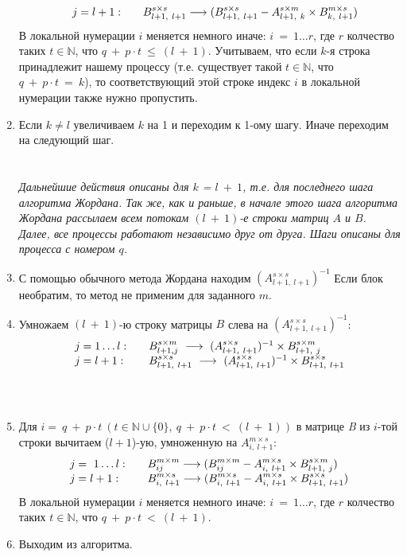 \documentclass[14pt,a4paper, openany]{article}
\begin{document}
\begin{enumerate}
$$\begin{array}{l l l}
	 & j = l+1:  & \quad B _{l+1,\ l+1}^{s \times s} \longrightarrow (B _{l+1,\ l+1}^{s \times s} - A _{l+1,\ k}^{s \times m} \times  B _{k,\ l+1}^{m \times s}) 
	\end{array}
	$$
	В локальной нумерации $i$ меняется немного иначе: $i\ =\ 1 \ldots r$, где $r$ колчество таких $t\in \mathbb{N}$, что 
	$q\ +\ p\cdot t\ \leq\ (l\ +\ 1)$. Учитываем, что если $k$-я строка принадлежит нашему процессу (т.е. существует такой 
	$t\in \mathbb{N}$, что $q\ +\ p\cdot t\ =\ k$), то соответствующий этой строке индекс $i$ в локальной нумерации 
	также нужно пропустить.

	\item Если $ k \neq l $ увеличиваем $k$ на 1 и переходим к 1-ому шагу. Иначе переходим на следующий шаг.\\\\\\
	\textit{ Дальнейшие действия описаны для $k$ = $l\ +\ 1$, т.е. для последнего шага алгоритма Жордана. Так же, как и раньше, в начале этого шага алгоритма Жордана рассылаем всем потокам $(l\ +\ 1)$-е строки матриц $A$ и $B$. 
	Далее, все процессы работают независимо друг от друга. Шаги описаны для процесса с номером $q$.}
	\item 
	С помощью обычного метода Жордана находим $ (A_{l+1,\ l+1}^{s \times s})^{-1} $
	Если блок необратим, то метод не применим для заданного $ m $.
	\item Умножаем $(l\ +\ 1)$-ю строку матрицы $B$ слева на $(A_{l+1,\ l+1}^{s \times s})^{-1}$:
	$$
	\begin{array}{l l}
		j = 1 \ldots l:	
			& \quad B_{l+1, j}^{s \times m} \ \longrightarrow \ (A_{l+1,\ l+1}^{s \times s})^{-1} \times B_{l+1,\ j}^{s \times m} \\
		j=l+1: 
			& \quad B_{l+1,\ l+1}^{s \times s} \ \longrightarrow \ (A_{l+1,\ l+1}^{s \times s})^{-1} \times B_{l+1,\ l+1}^{s \times s}
	\end{array}
	$$\\ \\ 
	\item Для $i =\ q\ +\ p\cdot t\ (t \in \mathbb{N}\cup \{ 0\},\ q\ +\ p\cdot t\ <\ (l\ +\ 1))$ в матрице \textit{B} из $i$-той строки вычитаем ($l+1$)-ую, умноженную на $A _{i,\ l+1}^{m \times s}$: \\
	$$
	\begin{array}{l l}
	j =\ 1 \ldots l:
	  & \quad B _{ij}^{m \times m} \longrightarrow (B _{ij}^{m \times m} - A _{i,\ l+1}^{m \times s} \times  B _{l+1,\ j}^{s \times m}) \\
	j = l+1:  &  \quad B _{i,\ l+1}^{m \times s} \longrightarrow (B _{i,\ l+1}^{m \times s} - A _{i,\ l+1}^{m \times s} \times  B _{l+1,\ l+1}^{s \times s}) \\
	\end{array}
	$$
	В локальной нумерации $i$ меняется немного иначе: $i\ =\ 1 \ldots r$, где $r$ колчество таких $t\in \mathbb{N}$, что 
	$q\ +\ p\cdot t\ <\ (l\ +\ 1)$.
	\item Выходим из алгоритма.
	\end{enumerate}
\end{document}
